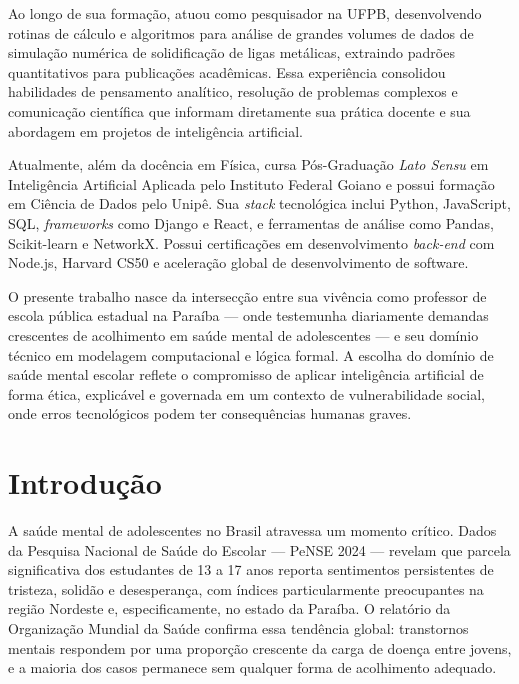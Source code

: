 \documentclass[
    12pt,
    openright,
    oneside,
    a4paper,
    english,
    brazil
]{abntex2}
\begin{document}
Ao longo de sua formação, atuou como pesquisador na UFPB, desenvolvendo rotinas de cálculo e algoritmos para análise de grandes volumes de dados de simulação numérica de solidificação de ligas metálicas, extraindo padrões quantitativos para publicações acadêmicas. Essa experiência consolidou habilidades de pensamento analítico, resolução de problemas complexos e comunicação científica que informam diretamente sua prática docente e sua abordagem em projetos de inteligência artificial.

Atualmente, além da docência em Física, cursa Pós-Graduação \textit{Lato Sensu} em Inteligência Artificial Aplicada pelo Instituto Federal Goiano e possui formação em Ciência de Dados pelo Unipê. Sua \textit{stack} tecnológica inclui Python, JavaScript, SQL, \textit{frameworks} como Django e React, e ferramentas de análise como Pandas, Scikit-learn e NetworkX. Possui certificações em desenvolvimento \textit{back-end} com Node.js, Harvard CS50 e aceleração global de desenvolvimento de software.

O presente trabalho nasce da intersecção entre sua vivência como professor de escola pública estadual na Paraíba --- onde testemunha diariamente demandas crescentes de acolhimento em saúde mental de adolescentes --- e seu domínio técnico em modelagem computacional e lógica formal. A escolha do domínio de saúde mental escolar reflete o compromisso de aplicar inteligência artificial de forma ética, explicável e governada em um contexto de vulnerabilidade social, onde erros tecnológicos podem ter consequências humanas graves.

\chapter{Introdução}

A saúde mental de adolescentes no Brasil atravessa um momento crítico. Dados da Pesquisa Nacional de Saúde do Escolar --- PeNSE 2024 \cite{ibge_pense_2024} --- revelam que parcela significativa dos estudantes de 13 a 17 anos reporta sentimentos persistentes de tristeza, solidão e desesperança, com índices particularmente preocupantes na região Nordeste e, especificamente, no estado da Paraíba. O relatório da Organização Mundial da Saúde \cite{who_mental_health_2022} confirma essa tendência global: transtornos mentais respondem por uma proporção crescente da carga de doença entre jovens, e a maioria dos casos permanece sem qualquer forma de acolhimento adequado.
\end{document}
